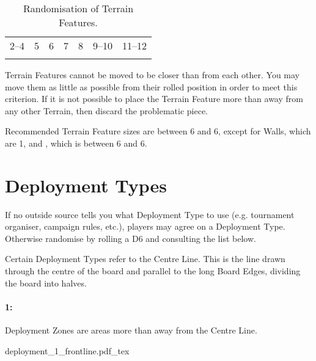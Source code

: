 \begin{table}[!ht]
	\vspace{-3pt}
	\centering
	\renewcommand{\arraystretch}{1.5}
	\setlength{\tabcolsep}{3pt}
	\begin{tabular}{M{2.1cm}M{2.1cm}M{2.1cm}M{2.1cm}M{2.1cm}M{2.1cm}M{2.1cm}}
		--4 & 5 & 6 & 7 & 8 & 9--10 & 11--12 \tabularnewline
		\hill{} & \waterterrain{} & \field{} & \forest{} & \ruins{} & \impassableterrain{} & \wall{} \tabularnewline
		\hline
	\end{tabular}
	\caption{Randomisation of Terrain Features.}
	\label{table/terrain_randomisation}
\end{table}

\RBbmc

Terrain Features cannot be moved to be closer than  from each other. You may move them as little as possible from their rolled position in order to meet this criterion. If it is not possible to place the Terrain Feature more than  away from any other Terrain, then discard the problematic piece.

Recommended Terrain Feature sizes are between 6\timess{} and 6\timess{}, except for Walls, which are 1\timess{}, and \impassableterrain{}, which is between 6\timess{} and 6\timess{}.

\section{Deployment Types}
\label{deployment_type}

If no outside source tells you what Deployment Type to use (e.g. tournament organiser, campaign rules, etc.), players may agree on a Deployment Type. Otherwise randomise by rolling a D6 and consulting the list below.

Certain Deployment Types refer to the Centre Line. This is the line drawn through the centre of the board and parallel to the long Board Edges, dividing the board into halves.

\hypertarget{frontline_clash}{\paragraph{1\spacebeforecolon{}: \frontlineclash}}
\idx[main=y]{\frontlineclash}
\label{figure/deployment}

Deployment Zones are areas more than  away from the Centre Line.
\begin{center}
	\def\svgwidth{0.36\textwidth}
	{deployment_1_frontline.pdf_tex}
\end{center}
\vspace{-3pt}

